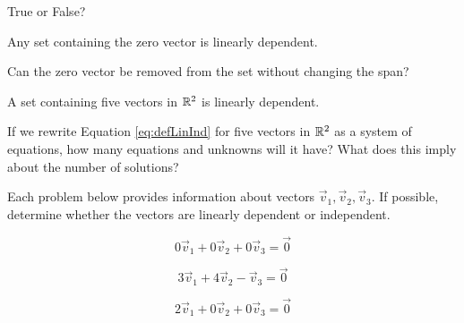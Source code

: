 \documentclass{ximera}
\begin{document}
\begin{problem} True or False?
\begin{problem}\label{prob:TFlinind1}
Any set containing the zero vector is linearly dependent.
\begin{multipleChoice}
 \end{multipleChoice}
  \begin{hint}
 Can the zero vector be removed from the set without changing the span?
 \end{hint}
 \end{problem}
\begin{problem}\label{prob:TFlinind2}
A set containing five vectors in $\mathbb{R}^2$ is linearly dependent.
\begin{multipleChoice}
 \end{multipleChoice}
  \begin{hint}
 If we rewrite Equation \ref{eq:defLinInd} for five vectors in $\mathbb{R}^2$ as a system of equations, how many equations and unknowns will it have?  What does this imply about the number of solutions?
 \end{hint}
\end{problem}

\end{problem}

\begin{problem}
Each problem below provides information about vectors $\vec{v}_1, \vec{v}_2, \vec{v}_3$.  If possible, determine whether the vectors are linearly dependent or independent.

\begin{problem}\label{prob:linindmultchoice5}
$$0\vec{v}_1+ 0\vec{v}_2+ 0\vec{v}_3=\vec{0}$$
\begin{multipleChoice}
 \end{multipleChoice}
\end{problem}

\begin{problem}\label{prob:linindmultchoice6}
$$3\vec{v}_1+ 4\vec{v}_2- \vec{v}_3=\vec{0}$$
\begin{multipleChoice}
 \end{multipleChoice}
\end{problem}

\begin{problem}\label{prob:linindmultchoice7}
$$2\vec{v}_1+ 0\vec{v}_2+ 0\vec{v}_3=\vec{0}$$
\begin{multipleChoice}
 \end{multipleChoice}
\end{problem}

\end{problem}
\end{document}
